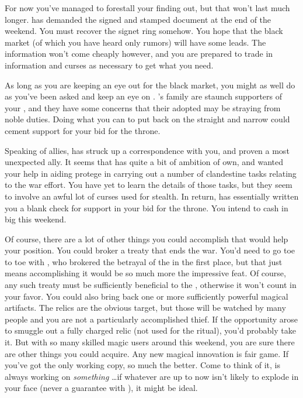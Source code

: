 \documentclass[char]{GL2020}
\begin{document}
For now you’ve managed to forestall your \cQueen{\parent} finding out, but that won’t last much longer. \cQueen{\They} has demanded the signed and stamped document at the end of the weekend. You must recover the signet ring somehow. You hope that the black market (of which you have heard only rumors) will have some leads. The information won’t come cheaply however, and you are prepared to trade in information and curses as necessary to get what you need.

As long as you are keeping an eye out for the black market, you might as well do as you’ve been asked and keep an eye on \cAdopted{}. \cAdopted{}’s family are staunch supporters of your \cQueen{\parent}, and they have some concerns that their adopted \cAdopted{\child} may be straying from \cAdopted{\their} noble duties. Doing what you can to put \cAdopted{\them} back on the straight and narrow could cement \cAdopted{\formal} support for your bid for the throne.

Speaking of allies, \cAntiChup{} has struck up a correspondence with you, and proven a most unexpected ally. It seems that \cAntiChup{} has quite a bit of ambition of \cAntiChup{\their} own, and wanted your help in aiding \cAntiChup{\their} protege in carrying out a number of clandestine tasks relating to the war effort. You have yet to learn the details of those tasks, but they seem to involve an awful lot of curses used for stealth. In return, \cAntiChup{} has essentially written you a blank check for support in your bid for the \pFarm{} throne. You intend to cash in big this weekend.

Of course, there are a lot of other things you could accomplish that would help your position. You could broker a treaty that ends the war. You’d need to go toe to toe with \cDiplomat{}, who brokered the betrayal of the \pShip{} in the first place, but that just means accomplishing it would be so much more the impressive feat. Of course, any such treaty must be sufficiently beneficial to the \pFarm{}, otherwise it won’t count in your favor. You could also bring back one or more sufficiently powerful magical artifacts. The relics are the obvious target, but those will be watched by many people and you are not a particularly accomplished thief. If the opportunity arose to smuggle out a fully charged relic (not used for the ritual), you’d probably take it. But with so many skilled magic users around this weekend, you are sure there are other things you could acquire. Any new magical innovation is fair game. If you’ve got the only working copy, so much the better. Come to think of it, \cCurse{} is always working on \emph{something} \ldots if whatever \cCurse{\they} are up to now isn’t likely to explode in your face (never a guarantee with \cCurse{}), it might be ideal.
\end{document}
